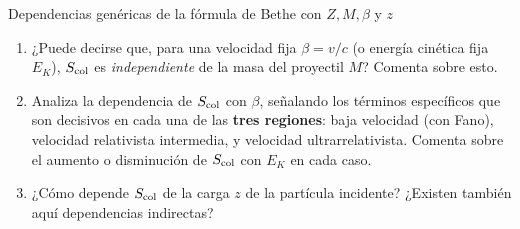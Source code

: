 \begin{Ejercicio}{Dependencias genéricas de la fórmula de Bethe con $Z, M, \beta$ y $z$}
\begin{enumerate}[label=\alph*)]
\item ¿Puede decirse que, para una velocidad fija $\beta = v/c$ (o energía cinética fija $E_K$), 
$S_\text{\text{col}}$ es \emph{independiente} de la masa del proyectil $M$?  
Comenta sobre esto.

\item Analiza la dependencia de $S_\text{\text{col}}$ con $\beta$, señalando los términos específicos que 
son decisivos en cada una de las \textbf{tres regiones}:  
baja velocidad (con Fano), velocidad relativista intermedia, y velocidad ultrarrelativista.  
Comenta sobre el aumento o disminución de $S_\text{\text{col}}$ con $E_K$ en cada caso.

\item ¿Cómo depende $S_\text{\text{col}}$ de la carga $z$ de la partícula incidente?  
¿Existen también aquí dependencias indirectas?

\end{enumerate}
\end{Ejercicio}


